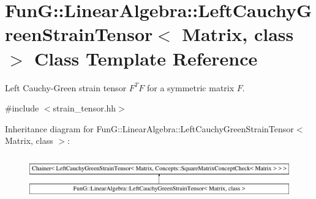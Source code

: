 \hypertarget{classFunG_1_1LinearAlgebra_1_1LeftCauchyGreenStrainTensor}{\section{Fun\-G\-:\-:Linear\-Algebra\-:\-:Left\-Cauchy\-Green\-Strain\-Tensor$<$ Matrix, class $>$ Class Template Reference}
\label{classFunG_1_1LinearAlgebra_1_1LeftCauchyGreenStrainTensor}
}


Left Cauchy-\/\-Green strain tensor $ F^T F $ for a symmetric matrix $ F $.  




{\ttfamily \#include $<$strain\-\_\-tensor.\-hh$>$}

Inheritance diagram for Fun\-G\-:\-:Linear\-Algebra\-:\-:Left\-Cauchy\-Green\-Strain\-Tensor$<$ Matrix, class $>$\-:\begin{figure}[H]
\begin{center}
\leavevmode
\includegraphics[height=1.851240cm]{classFunG_1_1LinearAlgebra_1_1LeftCauchyGreenStrainTensor}
\end{center}
\end{figure}

